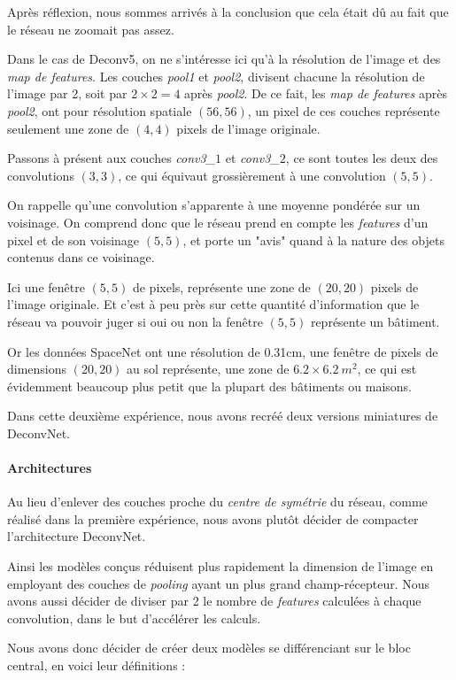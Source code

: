 \documentclass[a4paper, 11pt]{report}
\begin{document}
Après réflexion, nous sommes arrivés à la conclusion que cela était dû au fait que le réseau ne zoomait pas assez.

Dans le cas de Deconv5, on ne s'intéresse ici qu'à la résolution de l'image et des \emph{map de features}.
Les couches \emph{pool1} et \emph{pool2}, divisent chacune la résolution de l'image par 2, soit par $2 \times 2 = 4$ après \emph{pool2}.
De ce fait, les \emph{map de features} après \emph{pool2}, ont pour résolution spatiale $(56, 56)$, un pixel de ces couches représente seulement une zone de $(4, 4)$ pixels de l'image originale.

Passons à présent aux couches \emph{conv3\_$1$} et \emph{conv3\_$2$}, ce sont toutes les deux des convolutions $(3, 3)$, ce qui équivaut grossièrement à une convolution $(5, 5)$.

On rappelle qu'une convolution s'apparente à une moyenne pondérée sur un voisinage. On comprend donc que le réseau prend en compte les \emph{features} d'un pixel et de son voisinage $(5, 5)$, et porte un "avis" quand à la nature des objets contenus dans ce voisinage.

Ici une fenêtre $(5, 5)$ de pixels, représente une zone de $(20, 20)$ pixels de l'image originale. Et c'est à peu près sur cette quantité d'information que le réseau va pouvoir juger si oui ou non la fenêtre $(5, 5)$ représente un bâtiment.

Or les données SpaceNet ont une résolution de 0.31cm, une fenêtre de pixels de dimensions $(20, 20)$ au sol représente, une zone de $6.2 \times 6.2\ m^2$, ce qui est évidemment beaucoup plus petit que la plupart des bâtiments ou maisons.

Dans cette deuxième expérience, nous avons recréé deux versions miniatures de DeconvNet.
\paragraph{Architectures}
Au lieu d'enlever des couches proche du \emph{centre de symétrie} du réseau, comme réalisé dans la première expérience, nous avons plutôt décider de compacter l'architecture DeconvNet.

Ainsi les modèles conçus réduisent plus rapidement la dimension de l'image en employant des couches de \emph{pooling} ayant un plus grand champ-récepteur.
Nous avons aussi décider de diviser par 2 le nombre de \emph{features} calculées à chaque convolution, dans le but d’accélérer les calculs.

Nous avons donc décider de créer deux modèles se différenciant sur le bloc central, en voici leur définitions :
\end{document}
